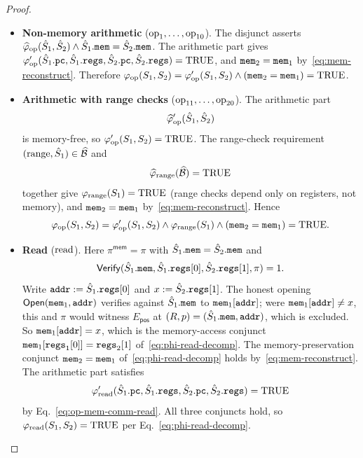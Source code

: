 \begin{proof}
\smallskip
\begin{itemize}
\item \textbf{Non-memory arithmetic} ($\mathrm{op}_1,\ldots,\mathrm{op}_{10}$).
  The disjunct asserts
  $\widehat{\varphi}_{\mathrm{op}}(\hat{S}_1,\hat{S}_2)\wedge\hat{S}_1.\mathtt{mem}=\hat{S}_2.\mathtt{mem}$.
  The arithmetic part gives
  $\varphi'_{\mathrm{op}}(\hat{S}_1.\mathtt{pc},\hat{S}_1.\mathtt{regs},\hat{S}_2.\mathtt{pc},\hat{S}_2.\mathtt{regs})=\mathrm{TRUE}$,
  and $\mathtt{mem}_2=\mathtt{mem}_1$ by~\eqref{eq:mem-reconstruct}. Therefore
  $\varphi_{\mathrm{op}}(S_1,S_2)=\varphi'_{\mathrm{op}}(S_1,S_2)\wedge(\mathtt{mem}_2=\mathtt{mem}_1)=\mathrm{TRUE}$.

\item \textbf{Arithmetic with range checks} ($\mathrm{op}_{11},\ldots,\mathrm{op}_{20}$).
  The arithmetic part
\[
  \widehat{\varphi}_{\mathrm{op}}'(\hat{S}_1,\hat{S}_2)
\]
is
  memory-free, so $\varphi_{\mathrm{op}}'(S_1,S_2)=\mathrm{TRUE}$. The range-check
  requirement $(\mathrm{range},\hat{S}_1)\in\widehat{\mathcal{B}}$ and
\[
  \widehat{\varphi}_{\mathrm{range}}(\widehat{\mathcal{B}})=\mathrm{TRUE}
\]
together give
  $\varphi_{\mathrm{range}}(S_1)=\mathrm{TRUE}$ (range checks depend only on registers,
  not memory), and $\mathtt{mem}_2=\mathtt{mem}_1$ by~\eqref{eq:mem-reconstruct}. Hence
\[
  \varphi_{\mathrm{op}}(S_1,S_2)=\varphi_{\mathrm{op}}'(S_1,S_2)\wedge\varphi_{\mathrm{range}}(S_1)\wedge(\mathtt{mem}_2=\mathtt{mem}_1)=\mathrm{TRUE}.
\]


\item \textbf{Read} ($\mathrm{read}$).
  Here $\pi^{\mathsf{mem}}=\pi$ with $\hat{S}_1.\mathtt{mem}=\hat{S}_2.\mathtt{mem}$ and
\[
  \mathsf{Verify}(\hat{S}_1.\mathtt{mem},\hat{S}_1.\mathtt{regs}[0],\hat{S}_2.\mathtt{regs}[1],\pi)=1.
\]
  Write $\mathtt{addr}:=\hat{S}_1.\mathtt{regs}[0]$ and $x:=\hat{S}_2.\mathtt{regs}[1]$. The honest
  opening $\mathsf{Open}(\mathtt{mem}_1,\mathtt{addr})$ verifies against $\hat{S}_1.\mathtt{mem}$ to
  $\mathtt{mem}_1[\mathtt{addr}]$; were $\mathtt{mem}_1[\mathtt{addr}]\neq x$, this and $\pi$ would witness
  $E_{\mathsf{pos}}$ at $(R,p)=(\hat{S}_1.\mathtt{mem},\mathtt{addr})$, which is excluded. So
  $\mathtt{mem}_1[\mathtt{addr}]=x$, which is the memory-access conjunct
  $\mathtt{mem}_1[\mathtt{regs}_1[0]]=\mathtt{regs}_2[1]$ of~\eqref{eq:phi-read-decomp}.  The
  memory-preservation conjunct $\mathtt{mem}_2=\mathtt{mem}_1$
  of~\eqref{eq:phi-read-decomp} holds by~\eqref{eq:mem-reconstruct}.  The
  arithmetic part satisfies
  \[
    \varphi'_{\mathrm{read}}(\hat{S}_1.\mathtt{pc},\hat{S}_1.\mathtt{regs},\hat{S}_2.\mathtt{pc},\hat{S}_2.\mathtt{regs})=\mathrm{TRUE}
  \]
  by Eq.~\eqref{eq:op-mem-comm-read}.  All three conjuncts hold, so
  $\varphi_{\mathrm{read}}(S_1,S_2)=\mathrm{TRUE}$ per Eq.~\eqref{eq:phi-read-decomp}.


\end{itemize}
\end{proof}
